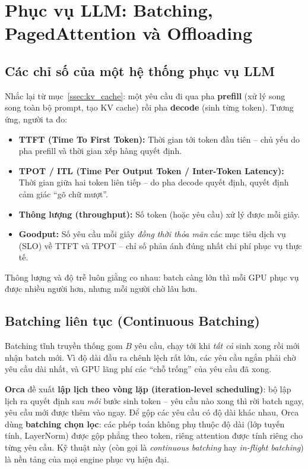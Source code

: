
\section{Phục vụ LLM: Batching, PagedAttention và Offloading \newtag}
\label{sec:llm_serving}

\subsection{Các chỉ số của một hệ thống phục vụ LLM}
\label{ssec:serving_metrics}
Nhắc lại từ mục~\ref{ssec:kv_cache}: một yêu cầu đi qua pha \textbf{prefill} (xử lý song song toàn bộ prompt, tạo KV cache) rồi pha \textbf{decode} (sinh từng token). Tương ứng, người ta đo:
\begin{itemize}
	\item \textbf{TTFT (Time To First Token):} Thời gian tới token đầu tiên -- chủ yếu do pha prefill và thời gian xếp hàng quyết định.
	\item \textbf{TPOT / ITL (Time Per Output Token / Inter-Token Latency):} Thời gian giữa hai token liên tiếp -- do pha decode quyết định, quyết định cảm giác “gõ chữ mượt”.
	\item \textbf{Thông lượng (throughput):} Số token (hoặc yêu cầu) xử lý được mỗi giây.
	\item \textbf{Goodput:} Số yêu cầu mỗi giây \emph{đồng thời thỏa mãn} các mục tiêu dịch vụ (SLO) về TTFT và TPOT -- chỉ số phản ánh đúng nhất chi phí phục vụ thực tế.
\end{itemize}
Thông lượng và độ trễ luôn giằng co nhau: batch càng lớn thì mỗi GPU phục vụ được nhiều người hơn, nhưng mỗi người chờ lâu hơn.

\subsection{Batching liên tục (Continuous Batching)}
\label{ssec:continuous_batching}
Batching tĩnh truyền thống gom $B$ yêu cầu, chạy tới khi \emph{tất cả} sinh xong rồi mới nhận batch mới. Vì độ dài đầu ra chênh lệch rất lớn, các yêu cầu ngắn phải chờ yêu cầu dài nhất, và GPU lãng phí các “chỗ trống” của yêu cầu đã xong.

\textbf{Orca} \cite{yu2022orca} đề xuất \textbf{lập lịch theo vòng lặp (iteration-level scheduling)}: bộ lập lịch ra quyết định sau \emph{mỗi} bước sinh token -- yêu cầu nào xong thì rời batch ngay, yêu cầu mới được thêm vào ngay. Để gộp các yêu cầu có độ dài khác nhau, Orca dùng \textbf{batching chọn lọc}: các phép toán không phụ thuộc độ dài (lớp tuyến tính, LayerNorm) được gộp phẳng theo token, riêng attention được tính riêng cho từng yêu cầu. Kỹ thuật này (còn gọi là \emph{continuous batching} hay \emph{in-flight batching}) là nền tảng của mọi engine phục vụ hiện đại.

